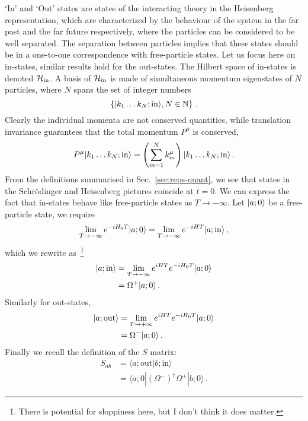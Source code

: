 `In' and `Out' states are states of the interacting theory in the Heisenberg
representation, which are characterized by the behaviour of the system in the
far past and the far future respectively, where the particles can be considered
to be well separated. The separation between particles implies that these states
should be in a one-to-one correspondence with free-particle states. Let us focus
here on in-states, similar results hold for the out-states. The Hilbert space of
in-states is denoted $\mathcal{H}_{\mathrm{in}}$. A basis of $\mathcal{H}_{\mathrm{in}}$ is made of simultaneous momentum
eigenstates of $N$ particles, where $N$ spans the set of integer numbers
\begin{equation}
    \label{eq:HinBasis}
    \left\{ | k_1 \ldots k_N; \mathrm{in} \rangle, N \in \mathbb{N} \right\}\, .
\end{equation}
Clearly the individual momenta are not conserved quantities, while translation
invariance guarantees that the total momentum $P^\mu$ is conserved,
\begin{equation}
    \label{eq:TotMomConserv}
    P^\mu | k_1 \ldots k_N; \mathrm{in} \rangle = 
    \left(\sum_{m=1}^N k^\mu_m\right) 
    | k_1 \ldots k_N; \mathrm{in} \rangle\, .
\end{equation}
From the definitions summarised in Sec.~\ref{sec:reps-quant}, we see that states
in the Schr\"odinger and Heisenberg pictures coincide at $t=0$. We can express
the fact that in-states behave like free-particle states as $T \to -\infty$. Let
$| a; 0 \rangle$ be a free-particle state, we require
\begin{equation}
    \label{eq:InAsympOne}
    \lim_{T\to-\infty} e^{-i H_0 T} | a;0 \rangle =
    \lim_{T\to-\infty} e^{-i H T} | a; \mathrm{in} \rangle\, ,
\end{equation}
which we rewrite as~\footnote{There is potential for sloppiness here, but I
don't think it does matter.}
\begin{align}
    \label{eq:InAsympTwo}
    | a; \mathrm{in} \rangle &= \lim_{T\to-\infty} e^{i H T} e^{-i H_0 T} | a;0 \rangle
    \\
    \label{eq:MollerOne}
    &= \Omega^+ | a; 0 \rangle\, .
\end{align}
Similarly for out-states,
\begin{align}
    \label{eq:OutAsympTwo}
    | a; \mathrm{out} \rangle &= \lim_{T\to +\infty} e^{i H T} e^{-i H_0 T} | a;0 \rangle
    \\
    \label{eq:MollerTwo}
    &= \Omega^- | a; 0 \rangle\, .
\end{align}
Finally we recall the definition of the $S$ matrix: 
\begin{align}
    \label{eq:SMatOne}
    S_{ab} &= \langle a; \mathrm{out} | b; \mathrm{in} \rangle \\
    \label{eq:SMatTwo}
    &= \langle a; 0 | \left(\Omega^-\right)^\dagger
    \Omega^+ | b; 0\rangle\, .
\end{align}

